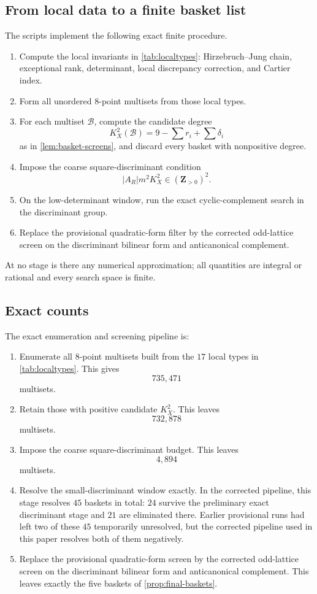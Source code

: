\documentclass[11pt]{article}
\theoremstyle{definition}
\begin{document}
\subsection{From local data to a finite basket list}
The scripts implement the following exact finite procedure.
\begin{enumerate}[label=\textup{(\alph*)}]
\item Compute the local invariants in \cref{tab:localtypes}: Hirzebruch--Jung chain, exceptional rank, determinant, local discrepancy correction, and Cartier index.
\item Form all unordered $8$-point multisets from those local types.
\item For each multiset $\mathcal B$, compute the candidate degree
\[
K_X^2(\mathcal B)=9-\sum r_i+\sum \delta_i
\]
as in \cref{lem:basket-screens}, and discard every basket with nonpositive degree.
\item Impose the coarse square-discriminant condition
\[
|A_R|m^2K_X^2\in (\mathbf Z_{>0})^2.
\]
\item On the low-determinant window, run the exact cyclic-complement search in the discriminant group.
\item Replace the provisional quadratic-form filter by the corrected odd-lattice screen on the discriminant bilinear form and anticanonical complement.
\end{enumerate}
At no stage is there any numerical approximation; all quantities are integral or rational and every search space is finite.

\subsection{Exact counts}
The exact enumeration and screening pipeline is:
\begin{enumerate}[label=\textup{(\arabic*)}]
\item Enumerate all $8$-point multisets built from the $17$ local types in \cref{tab:localtypes}. This gives
\[
735{,}471
\]
multisets.
\item Retain those with positive candidate $K_X^2$. This leaves
\[
732{,}878
\]
multisets.
\item Impose the coarse square-discriminant budget. This leaves
\[
4{,}894
\]
multisets.
\item Resolve the small-discriminant window exactly. In the corrected pipeline, this stage resolves $45$ baskets in total: $24$ survive the preliminary exact discriminant stage and $21$ are eliminated there. Earlier provisional runs had left two of these $45$ temporarily unresolved, but the corrected pipeline used in this paper resolves both of them negatively.
\item Replace the provisional quadratic-form screen by the corrected odd-lattice screen on the discriminant bilinear form and anticanonical complement. This leaves exactly the five baskets of \cref{prop:final-baskets}.
\end{enumerate}
\end{document}
